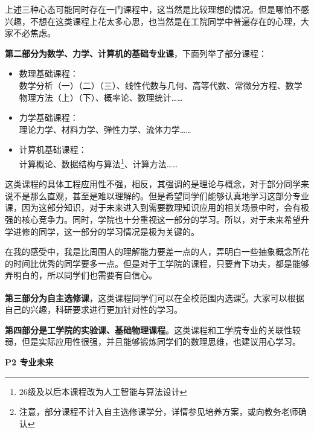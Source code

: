 \documentclass[11pt,oneside]{book}
\begin{document}
\vspace{10pt}

上述三种心态可能同时存在一门课程中，这当然是比较理想的情况。但是哪怕不感兴趣，不想在这类课程上花太多心思，也当然是在工院同学中普遍存在的心理，大家不必焦虑。

\vspace{10pt}

\textbf{第二部分为数学、力学、计算机的基础专业课}，下面列举了部分课程：
\begin{itemize}
	\item 数理基础课程：\\数学分析（一）（二）（三）、线性代数与几何、高等代数、常微分方程、数学物理方法（上）（下）、概率论、数理统计……
	\item 力学基础课程：\\理论力学、材料力学、弹性力学、流体力学……
	\item 计算机基础课程：\\计算概论、数据结构与算法\footnote{26级及以后本课程改为人工智能与算法设计}、计算方法……
\end{itemize}

这类课程的具体工程应用性不强，相反，其强调的是理论与概念，对于部分同学来说不是那么直观，甚至是难以理解的。但是希望同学们能够认真地学习这部分专业课，因为这部分知识，对于未来进入到需要数理知识应用的相关场景中时，会有极强的核心竞争力。同时，学院也十分重视这一部分的学习。所以，对于未来希望升学进修的同学，这一部分的学习情况是极为关键的。

\vspace{10pt}

在我的感受中，我是比周围人的理解能力要差一点的人，弄明白一些抽象概念所花的时间比优秀的同学要多一点。但是对于工学院的课程，只要肯下功夫，都是能够弄明白的，所以同学们也需要有自信心。

\vspace{10pt}

\textbf{第三部分为自主选修课}，这类课程同学们可以在全校范围内选课\footnote{注意，部分课程不计入自主选修课学分，详情参见培养方案，或向教务老师确认}。大家可以根据自己的兴趣，科研要求进行更加针对性的学习。

\vspace{10pt}

\textbf{第四部分是工学院的实验课、基础物理课程}。这类课程和工学院专业的关联性较弱，但是实际应用性很强，并且能够锻炼同学们的数理思维，也建议用心学习。

\vspace{10pt}

\textbf{P2 专业未来}
\end{document}
